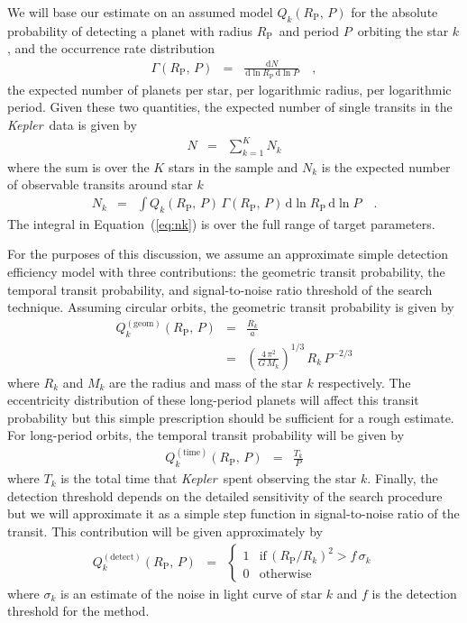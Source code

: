 \documentclass[12pt,preprint]{aastex}
\newcommand{\project}[1]{\textsl{#1}}
\newcommand{\kepler}{\project{Kepler}}
\renewcommand{\eqref}[1]{\ref{eq:#1}}
\newcommand{\Eq}[1]{Equation~(\eqref{#1})}
\newcommand{\eq}[1]{\Eq{#1}}
\newcommand{\eqlabel}[1]{\label{eq:#1}}
\newcommand{\dd}{\ensuremath{\,\mathrm{d}}}
\newcommand{\period}{{\ensuremath{P}}}
\newcommand{\rp}{{\ensuremath{R_\mathrm{P}}}}
\newcommand{\rate}{{\ensuremath{\Gamma}}}
\begin{document}
We will base our estimate on an assumed model $Q_k(\rp,\,\period)$ for the
absolute probability of detecting a planet with radius \rp\ and period
\period\ orbiting the star $k$, and the occurrence rate distribution
\begin{eqnarray}
\rate (\rp,\,\period) &=& \frac{\dd N}{\dd\ln\rp\dd\ln\period} \quad,
\end{eqnarray}
the expected number of planets per star, per logarithmic radius, per
logarithmic period.
Given these two quantities, the expected number of single transits in the
\kepler\ data is given by
\begin{eqnarray}
N &=& \sum_{k=1}^K N_k
\end{eqnarray}
where the sum is over the $K$ stars in the sample and $N_k$ is the expected
number of observable transits around star $k$
\begin{eqnarray}\eqlabel{nk}
N_k &=& \int Q_k(\rp,\,\period) \, \rate (\rp,\,\period)
    \dd\ln\rp \dd\ln\period \quad.
\end{eqnarray}
The integral in \eq{nk} is over the full range of target parameters.

For the purposes of this discussion, we assume an approximate simple detection
efficiency model with three contributions: the geometric transit probability,
the temporal transit probability, and signal-to-noise ratio threshold of the
search technique.
Assuming circular orbits, the geometric transit probability is given by
\citep{Winn:2010}
\begin{eqnarray}\eqlabel{q-geom}
Q_k^\mathrm{(geom)}(\rp,\,\period) &=& \frac{R_k}{a} \\
&=& \left( \frac{4\,\pi^2}{G\,M_k} \right)^{1/3} \, R_k \, \period^{-2/3}
\end{eqnarray}
where $R_k$ and $M_k$ are the radius and mass of the star $k$ respectively.
The eccentricity distribution of these long-period planets will affect this
transit probability \citep{Kipping:2014} but this simple prescription should
be sufficient for a rough estimate.
For long-period orbits, the temporal transit probability will be given by
\begin{eqnarray}\eqlabel{q-time}
Q_k^\mathrm{(time)}(\rp,\,\period) &=& \frac{T_k}{\period}
\end{eqnarray}
where $T_k$ is the total time that \kepler\ spent observing the star $k$.
Finally, the detection threshold depends on the detailed sensitivity of the
search procedure but we will approximate it as a simple step function in
signal-to-noise ratio of the transit.
This contribution will be given approximately by
\begin{eqnarray}
Q_k^\mathrm{(detect)}(\rp,\,\period) &=& \left\{\begin{array}{ll}
1 & \mathrm{if}\,\left(\rp/R_k\right)^2 > f\,\sigma_k \\
0 & \mathrm{otherwise}
\end{array}\right.
\end{eqnarray}
where $\sigma_k$ is an estimate of the noise in light curve of star $k$ and
$f$ is the detection threshold for the method.
\end{document}
